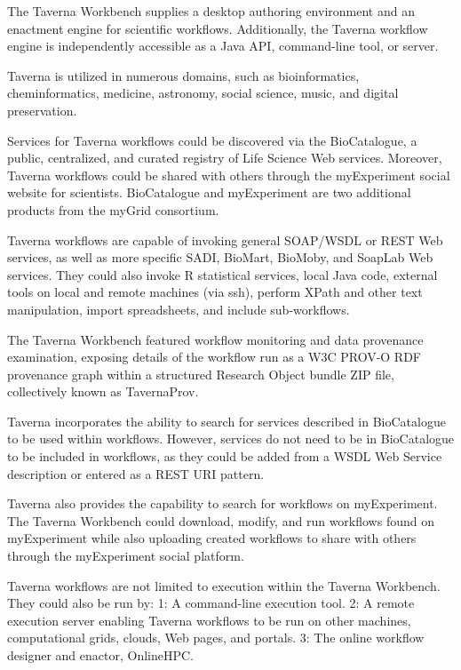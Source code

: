             The Taverna Workbench supplies a desktop authoring environment and an enactment engine for scientific workflows. Additionally, the Taverna workflow engine is independently accessible as a Java API, command-line tool, or server.
            
            Taverna is utilized in numerous domains, such as bioinformatics, cheminformatics, medicine, astronomy, social science, music, and digital preservation.
            
            Services for Taverna workflows could be discovered via the BioCatalogue, a public, centralized, and curated registry of Life Science Web services. Moreover, Taverna workflows could be shared with others through the myExperiment social website for scientists. BioCatalogue and myExperiment are two additional products from the myGrid consortium.
            
            Taverna workflows are capable of invoking general SOAP/WSDL or REST Web services, as well as more specific SADI, BioMart, BioMoby, and SoapLab Web services. They could also invoke R statistical services, local Java code, external tools on local and remote machines (via ssh), perform XPath and other text manipulation, import spreadsheets, and include sub-workflows.
            
            The Taverna Workbench featured workflow monitoring and data provenance examination, exposing details of the workflow run as a W3C PROV-O RDF provenance graph within a structured Research Object bundle ZIP file, collectively known as TavernaProv.
            
            Taverna incorporates the ability to search for services described in BioCatalogue to be used within workflows. However, services do not need to be in BioCatalogue to be included in workflows, as they could be added from a WSDL Web Service description or entered as a REST URI pattern.
            
            Taverna also provides the capability to search for workflows on myExperiment. The Taverna Workbench could download, modify, and run workflows found on myExperiment while also uploading created workflows to share with others through the myExperiment social platform.
            
            Taverna workflows are not limited to execution within the Taverna Workbench. They could also be run by: 1: A command-line execution tool. 2: A remote execution server enabling Taverna workflows to be run on other machines, computational grids, clouds, Web pages, and portals. 3: The online workflow designer and enactor, OnlineHPC.
            
